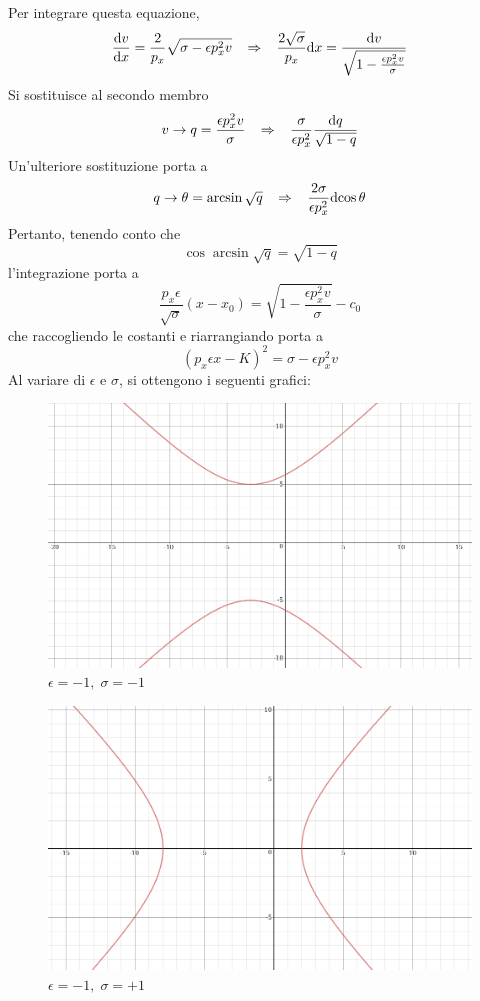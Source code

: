 Per integrare questa equazione,
\[ \frac{\mathrm{d} v}{\mathrm{d} x} = \frac{2}{p_x}\sqrt{\sigma - \epsilon p_x^2 v} \;\;\; \Rightarrow \;\;\;
	\frac{2\sqrt{\sigma}}{p_x} \mathrm{d} x = \frac{\mathrm{d} v}{ \sqrt{1 - \frac{\epsilon p_x^2 v}{\sigma}}} \]
Si sostituisce al secondo membro 
\[ v \rightarrow q = \frac{\epsilon p_x^2 v}{\sigma} \;\;\;\Rightarrow\;\;\; 
	\frac{\sigma}{\epsilon p_x^2} \frac{\mathrm{d} q}{\sqrt{1-q}} \]
Un'ulteriore sostituzione porta a 
\[ q \rightarrow \theta=\arcsin{\sqrt{q}} \;\;\;\Rightarrow\;\;\;
	\frac{2\sigma}{\epsilon p_x^2} \mathrm{d}{\cos\theta} \]
Pertanto, tenendo conto che 
\[ \cos\arcsin\sqrt{q} = \sqrt{1-q} \]
l'integrazione porta a 
\[ \frac{p_x\epsilon}{\sqrt{\sigma}}(x-x_0) = \sqrt{1-\frac{\epsilon p_x^2 v}{\sigma}} -c_0 \]
che raccogliendo le costanti e riarrangiando porta a 
\[ (p_x \epsilon x - K)^2 = \sigma - \epsilon p_x^2v \]
Al variare di $\epsilon$ e $\sigma$, si ottengono i seguenti grafici:
\begin{figure}[htbp]
 \centering
 \includegraphics[width=\textwidth]{images/foglio3_neg_neg}
	\caption*{\(\epsilon=-1, \;\sigma=-1\)}
 \label{figure:neg_neg}
\end{figure}
\begin{figure}[htbp]
 \centering
 \includegraphics[width=\textwidth]{images/foglio3_pos_neg}
	\caption*{\(\epsilon=-1, \;\sigma=+1\)}
 \label{figure:pos_neg}
\end{figure}
